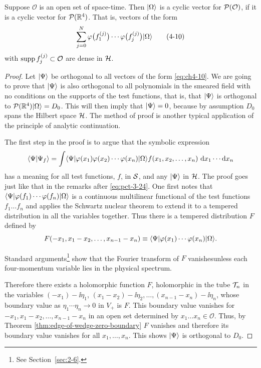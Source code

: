 \begin{theorem}[4-2]\label{thm:ch4-2-reeh-schlieder}
Suppose $\mathcal O$ is an open set of space-time. Then $\lvert \Omega\rangle$ is a
cyclic vector for $\mathcal{P}(\mathcal O)$, if it is a cyclic vector
for $\mathcal{P}(\mathbb{R}^4)$. That is, vectors of the form
\begin{equation}
  \sum_{j=0}^{N}
  \varphi\bigl(f_1^{(j)}\bigr)\cdots
  \varphi\bigl(f_j^{(j)}\bigr)\lvert \Omega\rangle
  \tag{4-10}\label{eq:ch4-10}
\end{equation}
with $\operatorname{supp} f_j^{(j)}\subset\mathcal O$ are dense in $\mathcal{H}$.

\begin{proof}
Let $\lvert \Psi\rangle$ be orthogonal to all vectors of the form \eqref{eq:ch4-10}. We are
going to prove that $\lvert \Psi\rangle$ is also orthogonal to all polynomials in the
smeared field with no conditions on the supports of the test functions, that
is, that $\lvert \Psi\rangle$ is orthogonal to
$\mathcal{P}(\mathbb{R}^4)\lvert \Omega\rangle=D_0$. This will then imply that
$\lvert \Psi\rangle=0$, because by assumption $D_0$ spans the Hilbert space $\mathcal{H}$.
The method of proof is another typical application of the principle of
analytic continuation.

The first step in the proof is to argue that the symbolic expression
\begin{equation*}
  \langle \Psi\vert \Psi_f\rangle
  =\int \langle \Psi\rvert\varphi(x_1)\varphi(x_2)\cdots
  \varphi(x_n)\lvert \Omega\rangle
  f(x_1,x_2,\ldots,x_n)\,\mathop{}\!\mathrm{d} x_1\cdots \mathop{}\!\mathrm{d} x_n
\end{equation*}
has a meaning for all test functions, $f$, in $\mathcal{S}$, and any
$\lvert \Psi\rangle$ in $\mathcal{H}$. The proof goes just like that in the remarks
after \eqref{eq:pct-3-24}. One first notes that
$\langle \Psi\rvert\varphi(f_1)\cdots\varphi(f_n)\lvert \Omega\rangle$ is a continuous
multilinear functional of the test functions $f_1\ldots f_n$ and applies the
Schwartz nuclear theorem to extend it to a tempered distribution in all the
variables together. Thus there is a tempered distribution $F$ defined by
\begin{equation*}
  F(-x_1,x_1-x_2,\ldots,x_{n-1}-x_n)
  \equiv
  \langle \Psi\rvert\varphi(x_1)\cdots\varphi(x_n)\lvert \Omega\rangle.
\end{equation*}

Standard arguments\footnote{%
See Section~\ref{sec:2-6}.}%
 show that the Fourier transform of $F$ vanishes\newline unless each four-momentum
 variable lies in the physical spectrum.

Therefore there exists a holomorphic function $F$, holomorphic in the tube
$\mathcal{T}_n$ in the variables $(-x_1)-\ii\eta_1$,
$(x_1-x_2)-\ii\eta_2,\ldots,(x_{n-1}-x_n)-\ii\eta_n$, whose boundary value
as $\eta_1\cdots\eta_n\to0$ in $V_+$ is $F$. This boundary value vanishes
for $-x_1,x_1-x_2,\ldots,x_{n-1}-x_n$ in an open set determined by
$x_1\ldots x_n\in\mathcal O$. Thus, by Theorem \ref{thm:edge-of-wedge-zero-boundary} $F$ vanishes and
therefore its boundary value vanishes for all $x_1,\ldots,x_n$. This shows
$\lvert \Psi\rangle$ is orthogonal to $D_0$.
\end{proof}
\end{theorem}

